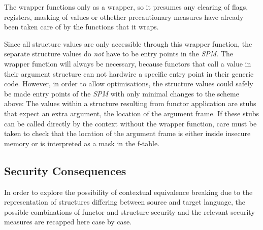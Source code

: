 The wrapper functions only as a wrapper, so it presumes any clearing of flags, registers, masking of values or othether precautionary measures have already been taken care of by the functions that it wraps.

Since all structure values are only accessible through this wrapper function, the separate structure values do \emph{not} have to be entry points in the \emph{SPM}. The wrapper function will always be necessary, because functors that call a value in their argument structure can not hardwire a specific entry point in their generic code.
However, in order to allow optimisations, the structure values could safely be made entry points of the \emph{SPM} with only minimal changes to the scheme above: The values within a structure resulting from functor application are stubs that expect an extra argument, the location of the argument frame. 
If these stubs can be called directly by the context without the wrapper function, care must be taken to check that the location of the argument frame is either inside insecure memory or is interpreted as a mask in the f-table.




\subsection{Security Consequences}

In order to explore the possibility of contextual equivalence breaking due to the representation of structures differing between source and target language, the possible combinations of functor and structure security and the relevant security measures are recapped here case by case.

